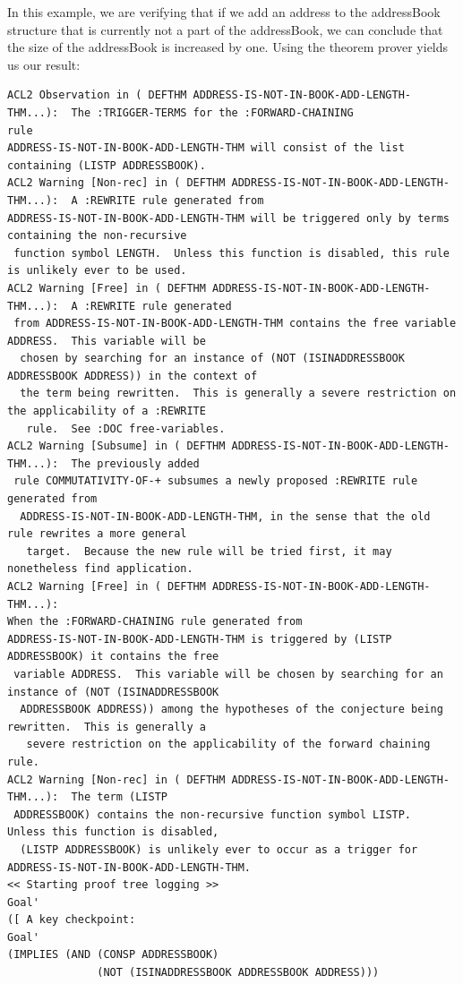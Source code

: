 \documentclass[11pt, letterpaper]{report}
\begin{document}
\begin{description}
In this example, we are verifying that if we add an address to the addressBook structure that is currently not a part of the addressBook, we can conclude that the size of the addressBook is increased by one.  Using the theorem prover yields us our result:
\scriptsize{\begin{verbatim}
ACL2 Observation in ( DEFTHM ADDRESS-IS-NOT-IN-BOOK-ADD-LENGTH-THM...):  The :TRIGGER-TERMS for the :FORWARD-CHAINING 
rule 
ADDRESS-IS-NOT-IN-BOOK-ADD-LENGTH-THM will consist of the list containing (LISTP ADDRESSBOOK).
ACL2 Warning [Non-rec] in ( DEFTHM ADDRESS-IS-NOT-IN-BOOK-ADD-LENGTH-THM...):  A :REWRITE rule generated from 
ADDRESS-IS-NOT-IN-BOOK-ADD-LENGTH-THM will be triggered only by terms containing the non-recursive
 function symbol LENGTH.  Unless this function is disabled, this rule is unlikely ever to be used.
ACL2 Warning [Free] in ( DEFTHM ADDRESS-IS-NOT-IN-BOOK-ADD-LENGTH-THM...):  A :REWRITE rule generated
 from ADDRESS-IS-NOT-IN-BOOK-ADD-LENGTH-THM contains the free variable ADDRESS.  This variable will be
  chosen by searching for an instance of (NOT (ISINADDRESSBOOK ADDRESSBOOK ADDRESS)) in the context of
  the term being rewritten.  This is generally a severe restriction on the applicability of a :REWRITE
   rule.  See :DOC free-variables.
ACL2 Warning [Subsume] in ( DEFTHM ADDRESS-IS-NOT-IN-BOOK-ADD-LENGTH-THM...):  The previously added
 rule COMMUTATIVITY-OF-+ subsumes a newly proposed :REWRITE rule generated from
  ADDRESS-IS-NOT-IN-BOOK-ADD-LENGTH-THM, in the sense that the old rule rewrites a more general
   target.  Because the new rule will be tried first, it may nonetheless find application.
ACL2 Warning [Free] in ( DEFTHM ADDRESS-IS-NOT-IN-BOOK-ADD-LENGTH-THM...):  
When the :FORWARD-CHAINING rule generated from
ADDRESS-IS-NOT-IN-BOOK-ADD-LENGTH-THM is triggered by (LISTP ADDRESSBOOK) it contains the free
 variable ADDRESS.  This variable will be chosen by searching for an instance of (NOT (ISINADDRESSBOOK
  ADDRESSBOOK ADDRESS)) among the hypotheses of the conjecture being rewritten.  This is generally a
   severe restriction on the applicability of the forward chaining rule.
ACL2 Warning [Non-rec] in ( DEFTHM ADDRESS-IS-NOT-IN-BOOK-ADD-LENGTH-THM...):  The term (LISTP
 ADDRESSBOOK) contains the non-recursive function symbol LISTP.  Unless this function is disabled,
  (LISTP ADDRESSBOOK) is unlikely ever to occur as a trigger for ADDRESS-IS-NOT-IN-BOOK-ADD-LENGTH-THM.
<< Starting proof tree logging >>
Goal'
([ A key checkpoint:
Goal'
(IMPLIES (AND (CONSP ADDRESSBOOK)
              (NOT (ISINADDRESSBOOK ADDRESSBOOK ADDRESS)))

\end{verbatim}}
\end{description}
\end{document}
